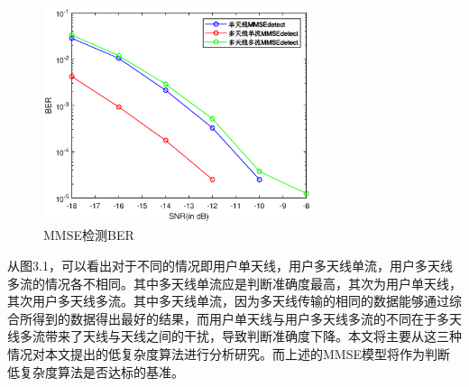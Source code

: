 \documentclass[bachelor,nocolorlinks, printoneside]{seuthesis} %
\begin{document}
\begin{Main}
\begin{figure}[htbp!]
	\centering \includegraphics[width=0.7\textwidth]{img/3_8.eps} \caption{MMSE检测BER}
\end{figure}

从图3.1，可以看出对于不同的情况即用户单天线，用户多天线单流，用户多天线多流的情况各不相同。其中多天线单流应是判断准确度最高，其次为用户单天线，其次用户多天线多流。其中多天线单流，因为多天线传输的相同的数据能够通过综合所得到的数据得出最好的结果，而用户单天线与用户多天线多流的不同在于多天线多流带来了天线与天线之间的干扰，导致判断准确度下降。本文将主要从这三种情况对本文提出的低复杂度算法进行分析研究。而上述的MMSE模型将作为判断低复杂度算法是否达标的基准。



\end{Main}
\end{document}
